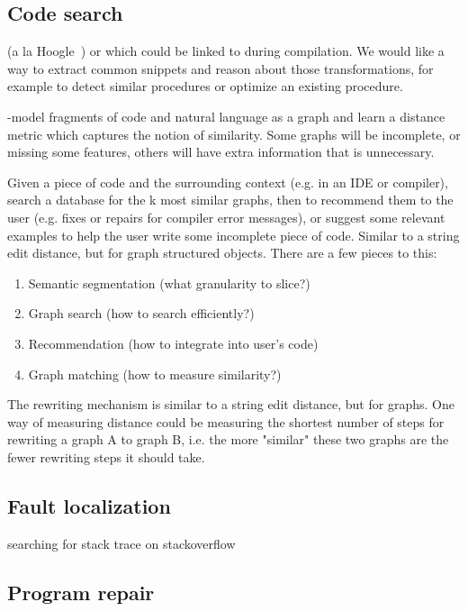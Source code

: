\documentclass[11pt]{article}
\begin{document}
    \subsection{Code search}

    (a la Hoogle~\citep{james2020digging}) or which could be linked to during compilation. We would like a way to extract common snippets and reason about those transformations, for example to detect similar procedures or optimize an existing procedure.

    -model fragments of code and natural language as a graph and learn a distance metric which captures the notion of similarity. Some graphs will be incomplete, or missing some features, others will have extra information that is unnecessary.

    Given a piece of code and the surrounding context (e.g. in an IDE or compiler), search a database for the k most similar graphs, then to recommend them to the user (e.g. fixes or repairs for compiler error messages), or suggest some relevant examples to help the user write some incomplete piece of code. Similar to a string edit distance, but for graph structured objects. There are a few pieces to this:

    \begin{enumerate}
        \item Semantic segmentation (what granularity to slice?)
        \item Graph search (how to search efficiently?)
        \item Recommendation (how to integrate into user's code)
        \item Graph matching (how to measure similarity?)
    \end{enumerate}

    The rewriting mechanism is similar to a string edit distance, but for graphs. One way of measuring distance could be measuring the shortest number of steps for rewriting a graph A to graph B, i.e. the more "similar" these two graphs are the fewer rewriting steps it should take.

    \subsection{Fault localization}

    searching for stack trace on stackoverflow

    \subsection{Program repair}
\end{document}
